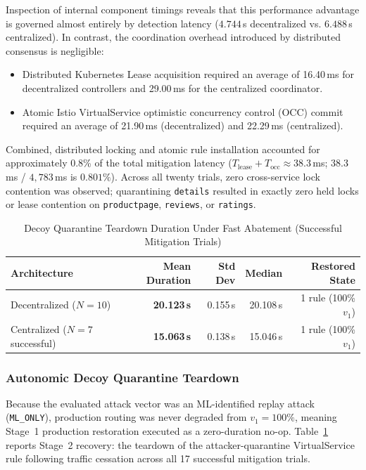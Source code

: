 Inspection of internal component timings reveals that this performance advantage is governed almost entirely by detection latency ($4.744$\,s decentralized vs. $6.488$\,s centralized). In contrast, the coordination overhead introduced by distributed consensus is negligible:
\begin{itemize}
    \item Distributed Kubernetes Lease acquisition required an average of 16.40\,ms for decentralized controllers and 29.00\,ms for the centralized coordinator.
    \item Atomic Istio VirtualService optimistic concurrency control (OCC) commit required an average of 21.90\,ms (decentralized) and 22.29\,ms (centralized).
\end{itemize}
Combined, distributed locking and atomic rule installation accounted for approximately 0.8\% of the total mitigation latency ($T_{\text{lease}} + T_{\text{occ}} \approx 38.3$\,ms; $38.3$\,ms / $4{,}783$\,ms is $0.801\%$). Across all twenty trials, zero cross-service lock contention was observed; quarantining \texttt{details} resulted in exactly zero held locks or lease contention on \texttt{productpage}, \texttt{reviews}, or \texttt{ratings}.

\begin{table}[b]
\centering
\caption{Decoy Quarantine Teardown Duration Under Fast Abatement (Successful Mitigation Trials)}
\label{tab:scenario1_recovery}
\small
\begin{tabular}{lrrrr}
\toprule
\textbf{Architecture} & \textbf{Mean Duration} & \textbf{Std Dev} & \textbf{Median} & \textbf{Restored State} \\
\midrule
Decentralized ($N=10$) & \textbf{20.123\,s} & 0.155\,s & 20.108\,s & 1 rule (100\% $v_1$) \\
Centralized ($N=7$ successful) & \textbf{15.063\,s} & 0.138\,s & 15.046\,s & 1 rule (100\% $v_1$) \\
\bottomrule
\end{tabular}
\vspace{1ex}
\end{table}

\subsubsection{Autonomic Decoy Quarantine Teardown}
Because the evaluated attack vector was an ML-identified replay attack (\texttt{ML\_ONLY}), production routing was never degraded from $v_1=100\%$, meaning Stage~1 production restoration executed as a zero-duration no-op. Table~\ref{tab:scenario1_recovery} reports Stage~2 recovery: the teardown of the attacker-quarantine VirtualService rule following traffic cessation across all 17 successful mitigation trials.

